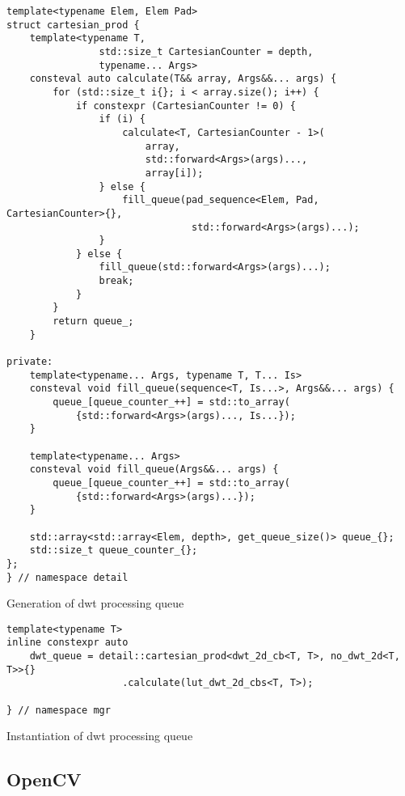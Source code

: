 \begin{listing}[!htb]
\begin{verbatim}
template<typename Elem, Elem Pad>
struct cartesian_prod {
    template<typename T,
                std::size_t CartesianCounter = depth,
                typename... Args>
    consteval auto calculate(T&& array, Args&&... args) {
        for (std::size_t i{}; i < array.size(); i++) {
            if constexpr (CartesianCounter != 0) {
                if (i) {
                    calculate<T, CartesianCounter - 1>(
                        array,
                        std::forward<Args>(args)...,
                        array[i]);
                } else {
                    fill_queue(pad_sequence<Elem, Pad, CartesianCounter>{},
                                std::forward<Args>(args)...);
                }
            } else {
                fill_queue(std::forward<Args>(args)...);
                break;
            }
        }
        return queue_;
    }

private:
    template<typename... Args, typename T, T... Is>
    consteval void fill_queue(sequence<T, Is...>, Args&&... args) {
        queue_[queue_counter_++] = std::to_array(
            {std::forward<Args>(args)..., Is...});
    }

    template<typename... Args>
    consteval void fill_queue(Args&&... args) {
        queue_[queue_counter_++] = std::to_array(
            {std::forward<Args>(args)...});
    }

    std::array<std::array<Elem, depth>, get_queue_size()> queue_{};
    std::size_t queue_counter_{};
};
} // namespace detail
\end{verbatim}
\caption{Generation of dwt processing queue}
\label{lst:dwt_queue}
\end{listing}

\begin{listing}[!htb]
\begin{verbatim}
template<typename T>
inline constexpr auto
    dwt_queue = detail::cartesian_prod<dwt_2d_cb<T, T>, no_dwt_2d<T, T>>{}
                    .calculate(lut_dwt_2d_cbs<T, T>);

} // namespace mgr
\end{verbatim}
\caption{Instantiation of dwt processing queue}
\label{lst:dwt_queue_instantiation}
\end{listing}

\subsection{OpenCV}

